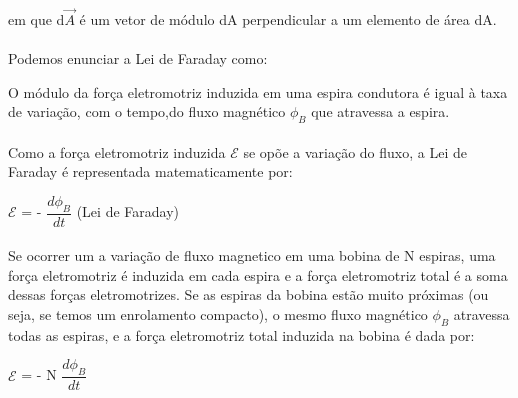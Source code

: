 \documentclass[a4paper, 12pt]{article}
\begin{document}
\paragraph{}em que d$\overrightarrow{A}$ é um vetor de módulo dA perpendicular a um elemento de área dA.

\paragraph{}Podemos enunciar a Lei de Faraday como:
\\
\begin{mdframed}[backgroundcolor=gray!20]
	\begin{center}
		O módulo da força eletromotriz induzida em uma espira condutora é igual à taxa de variação, com o tempo,do fluxo magnético $\phi_B$ que atravessa a espira.
		\end{center}
\end{mdframed}

\paragraph{}Como a força eletromotriz induzida $\mathcal  {E}$ se opõe a variação do fluxo, a Lei de Faraday é representada matematicamente por:
\\
\begin{mdframed}[backgroundcolor=gray!20]
	\begin{center}
		$\mathcal  {E}$ = - $\dfrac{d \phi_B}{dt}$ (Lei de Faraday)
		\end{center}
\end{mdframed}

\paragraph{}Se ocorrer um a variação de fluxo magnetico em uma bobina de N espiras, uma força eletromotriz é induzida em cada espira e a força eletromotriz total é a soma dessas forças eletromotrizes. Se as espiras da bobina estão muito próximas (ou seja, se temos um enrolamento compacto), o mesmo fluxo magnético $\phi_B$ atravessa todas as espiras, e a força eletromotriz total induzida na bobina é dada por:
\\
\begin{mdframed}[backgroundcolor=gray!20]
	\begin{center}
		$\mathcal  {E}$ = - N $\dfrac{d \phi_B}{dt}$
		\end{center}
\end{mdframed}
\end{document}
